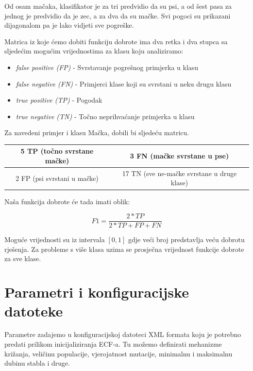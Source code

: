 \documentclass[times, utf8, zavrsni]{fer}
\begin{document}
Od osam mačaka, klasifikator je za tri predvidio da su psi, a od šest pasa za jednog je predvidio da je zec, a za dva da su mačke. Svi pogoci su prikazani dijagonalom pa je lako vidjeti sve pogreške.

Matrica iz koje ćemo dobiti funkciju dobrote ima dva retka i dva stupca sa sljedećim mogućim vrijednostima za klasu koju analiziramo:

\begin{itemize}
\item \textit{false positive (FP)} - Svrstavanje pogrešnog primjerka u klasu
\item \textit{false negative (FN)} - Primjerci klase koji su svrstani u neku drugu klasu
\item \textit{true positive  (TP)} - Pogodak
\item \textit{true negative  (TN)} - Točno neprihvaćanje primjerka u klasu

\end{itemize}

Za navedeni primjer i klasu Mačka, dobili bi sljedeću matricu.

\begin{center}
\begin{tabular}{|c|c|}
\hline
5 TP (točno svrstane mačke) & 3 FN (mačke svrstane u pse) \\
\hline
2 FP (psi svrstani u mačke) & 17 TN (sve ne-mačke svrstane u druge klase) \\
\hline
\end{tabular}
\end{center}

Naša funkcija dobrote će tada imati oblik:

\[ F1 = \frac{2 * TP}{2 * TP + FP + FN} \]

Moguće vrijednosti su iz intervala $[0, 1]$ gdje veći broj predstavlja veću dobrotu rješenja. Za probleme s više klasa uzima se prosječna vrijednost funkcije dobrote za sve klase.



\section{Parametri i konfiguracijske datoteke}

Parametre zadajemo u konfiguracijskoj datoteci XML formata koju je potrebno predati prilikom inicijaliziranja ECF-a. Tu možemo definirati mehanizme križanja, veličinu populacije, vjerojatnost mutacije, minimalnu i maksimalnu dubinu stabla i druge. 
\end{document}
